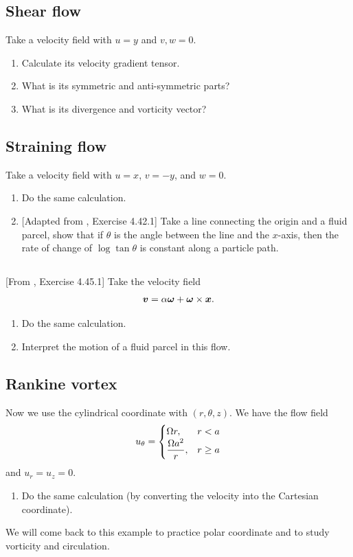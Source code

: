 \documentclass[11pt,letterpaper]{report}
\begin{document}
\subsection{Shear flow}
Take a velocity field with $u=y$ and $v,w=0$. 
\begin{enumerate}
    \item Calculate its velocity gradient tensor.
    \item What is its symmetric and anti-symmetric parts?
    \item What is its divergence and vorticity vector? 
\end{enumerate}

\subsection{Straining flow}
Take a velocity field with $u=x$, $v=-y$, and $w=0$. 
\begin{enumerate}
    \item Do the same calculation.
    \item {[Adapted from \cite{Aris_62}, Exercise 4.42.1]} Take a line connecting the origin and a fluid parcel, show that if $\theta$ is the angle between the line and the $x$-axis, then the rate of change of $\log\tan\theta$ is constant along a particle path. 
\end{enumerate}

\subsection{}
[From \cite{Aris_62}, Exercise 4.45.1] Take the velocity field
\begin{align}
    \boldsymbol{v} = \alpha\boldsymbol{\omega} + \boldsymbol{\omega} \times \boldsymbol{x}.
\end{align}
\begin{enumerate}
    \item Do the same calculation.
    \item Interpret the motion of a fluid parcel in this flow.
\end{enumerate}

\subsection{Rankine vortex}
Now we use the cylindrical coordinate with $(r,\theta,z)$. We have the flow field
\begin{align}
    u_\theta = \begin{cases}
        \Omega r, & r<a\\
        \displaystyle{\frac{\Omega a^2}{r}}, & r\geq a
    \end{cases}
\end{align}
and $u_r = u_z = 0$. 
\begin{enumerate}
    \item Do the same calculation (by converting the velocity into the Cartesian coordinate).
\end{enumerate}
We will come back to this example to practice polar coordinate and to study vorticity and circulation.  
\end{document}
